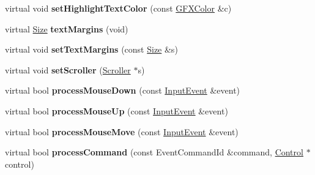 \begin{DoxyCompactItemize}
\item 
virtual void {\bfseries set\+Highlight\+Text\+Color} (const \hyperlink{structGFXColor}{G\+F\+X\+Color} \&c)\hypertarget{classPicker_a4aacb5f94bac6a66f1f5378b0b47499c}{}\label{classPicker_a4aacb5f94bac6a66f1f5378b0b47499c}

\item 
virtual \hyperlink{structSize}{Size} {\bfseries text\+Margins} (void)\hypertarget{classPicker_a4f7fc62fae00faf311c630ea7348939c}{}\label{classPicker_a4f7fc62fae00faf311c630ea7348939c}

\item 
virtual void {\bfseries set\+Text\+Margins} (const \hyperlink{structSize}{Size} \&s)\hypertarget{classPicker_a3ee00a7c9aae20ada93c0c7ca4c6d7ff}{}\label{classPicker_a3ee00a7c9aae20ada93c0c7ca4c6d7ff}

\item 
virtual void {\bfseries set\+Scroller} (\hyperlink{classScroller}{Scroller} $\ast$s)\hypertarget{classPicker_a54d4789b628c8f07bc05ad00eb57ae5a}{}\label{classPicker_a54d4789b628c8f07bc05ad00eb57ae5a}

\item 
virtual bool {\bfseries process\+Mouse\+Down} (const \hyperlink{structInputEvent}{Input\+Event} \&event)\hypertarget{classPicker_a02be56c3c93e035390f520ad84e9d82e}{}\label{classPicker_a02be56c3c93e035390f520ad84e9d82e}

\item 
virtual bool {\bfseries process\+Mouse\+Up} (const \hyperlink{structInputEvent}{Input\+Event} \&event)\hypertarget{classPicker_a35801795e12d2dcb78253b061179b182}{}\label{classPicker_a35801795e12d2dcb78253b061179b182}

\item 
virtual bool {\bfseries process\+Mouse\+Move} (const \hyperlink{structInputEvent}{Input\+Event} \&event)\hypertarget{classPicker_ae4b7577ed08a01dd03b827a746716fa2}{}\label{classPicker_ae4b7577ed08a01dd03b827a746716fa2}

\item 
virtual bool {\bfseries process\+Command} (const Event\+Command\+Id \&command, \hyperlink{classControl}{Control} $\ast$control)\hypertarget{classPicker_a7140b53eefff3cdca086c8d098e77c3f}{}\label{classPicker_a7140b53eefff3cdca086c8d098e77c3f}

\end{DoxyCompactItemize}
